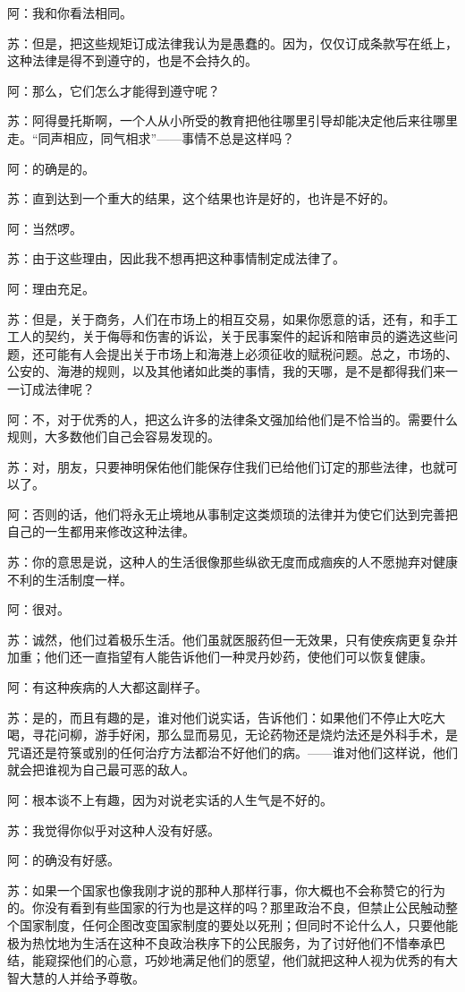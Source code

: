 \documentclass[12pt,oneside]{book}
\begin{document}
阿：我和你看法相同。

苏：但是，把这些规矩订成法律我认为是愚蠢的。因为，仅仅订成条款写在纸上，这种法律是得不到遵守的，也是不会持久的。

阿：那么，它们怎么才能得到遵守呢？

苏：阿得曼托斯啊，一个人从小所受的教育把他往哪里引导却能决定他后来往哪里走。“同声相应，同气相求”——事情不总是这样吗？

阿：的确是的。

苏：直到达到一个重大的结果，这个结果也许是好的，也许是不好的。

阿：当然啰。

苏：由于这些理由，因此我不想再把这种事情制定成法律了。

阿：理由充足。

苏：但是，关于商务，人们在市场上的相互交易，如果你愿意的话，还有，和手工工人的契约，关于侮辱和伤害的诉讼，关于民事案件的起诉和陪审员的遴选这些问题，还可能有人会提出关于市场上和海港上必须征收的赋税问题。总之，市场的、公安的、海港的规则，以及其他诸如此类的事情，我的天哪，是不是都得我们来一一订成法律呢？

阿：不，对于优秀的人，把这么许多的法律条文强加给他们是不恰当的。需要什么规则，大多数他们自己会容易发现的。

苏：对，朋友，只要神明保佑他们能保存住我们已给他们订定的那些法律，也就可以了。

阿：否则的话，他们将永无止境地从事制定这类烦琐的法律并为使它们达到完善把自己的一生都用来修改这种法律。

苏：你的意思是说，这种人的生活很像那些纵欲无度而成痼疾的人不愿抛弃对健康不利的生活制度一样。

阿：很对。

苏：诚然，他们过着极乐生活。他们虽就医服药但一无效果，只有使疾病更复杂并加重；他们还一直指望有人能告诉他们一种灵丹妙药，使他们可以恢复健康。

阿：有这种疾病的人大都这副样子。

苏：是的，而且有趣的是，谁对他们说实话，告诉他们：如果他们不停止大吃大喝，寻花问柳，游手好闲，那么显而易见，无论药物还是烧灼法还是外科手术，是咒语还是符箓或别的任何治疗方法都治不好他们的病。——谁对他们这样说，他们就会把谁视为自己最可恶的敌人。

阿：根本谈不上有趣，因为对说老实话的人生气是不好的。

苏：我觉得你似乎对这种人没有好感。

阿：的确没有好感。

苏：如果一个国家也像我刚才说的那种人那样行事，你大概也不会称赞它的行为的。你没有看到有些国家的行为也是这样的吗？那里政治不良，但禁止公民触动整个国家制度，任何企图改变国家制度的要处以死刑；但同时不论什么人，只要他能极为热忱地为生活在这种不良政治秩序下的公民服务，为了讨好他们不惜奉承巴结，能窥探他们的心意，巧妙地满足他们的愿望，他们就把这种人视为优秀的有大智大慧的人并给予尊敬。
\end{document}
